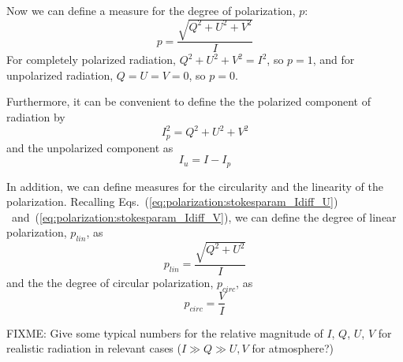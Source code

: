 Now we can define a measure for the degree of polarization, $p$:
\begin{equation}
  \label{eq:polarization:pol_degree}
  p = \frac{\sqrt{Q^2 + U^2 + V^2}}{I}
\end{equation}
For completely polarized radiation, $Q^2 + U^2 + V^2 = I^2$, so $p =
1$, and for unpolarized radiation, $Q = U = V = 0$, so $p = 0$.

Furthermore, it can be convenient to define the the polarized
component of radiation by
\begin{equation}
  \label{eq:polarization:pol_component}
  I_p^2 = Q^2 + U^2 + V^2
\end{equation}
and the unpolarized component as
\begin{equation}
  \label{eq:polarization:unpol_component}
  I_u = I - I_p
\end{equation}

In addition, we can define measures for the circularity and the
linearity of the polarization.
Recalling Eqs.~(\ref{eq:polarization:stokesparam_Idiff_U})%
~and~(\ref{eq:polarization:stokesparam_Idiff_V}),
we can define the degree of linear polarization, $p_{lin}$, as
\begin{equation}
  \label{eq:polarization:p_lin}
 p_{lin} = \frac{\sqrt{Q^2 + U^2}}{I} 
\end{equation}
and the the degree of circular polarization, $p_{circ}$, as
\begin{equation}
  \label{eq:polarization:p_circ}
 p_{circ} = \frac{V}{I} 
\end{equation}

FIXME: Give some typical numbers for the relative magnitude of $I$,
$Q$, $U$, $V$
for realistic radiation in relevant cases ($I \gg Q \gg U,V$ for
atmosphere?)




